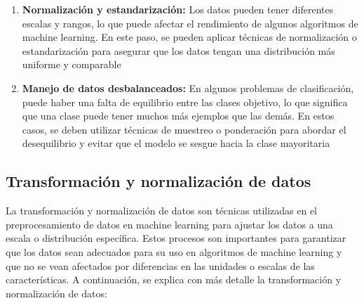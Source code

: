 \documentclass[../main.tex]{subfiles}
\begin{document}
\begin{enumerate}
            \item \textbf{Normalización y estandarización:} Los datos pueden tener diferentes escalas y rangos, lo que puede afectar el rendimiento de algunos algoritmos de machine learning. En este paso, se pueden aplicar técnicas de normalización o estandarización para asegurar que los datos tengan una distribución más uniforme y comparable
            \item \textbf{Manejo de datos desbalanceados:} En algunos problemas de clasificación, puede haber una falta de equilibrio entre las clases objetivo, lo que significa que una clase puede tener muchos más ejemplos que las demás. En estos casos, se deben utilizar técnicas de muestreo o ponderación para abordar el desequilibrio y evitar que el modelo se sesgue hacia la clase mayoritaria
        \end{enumerate}

    \subsection{Transformación y normalización de datos}
        La transformación y normalización de datos son técnicas utilizadas en el preprocesamiento de datos en machine learning para ajustar los datos a una escala o distribución específica. Estos procesos son importantes para garantizar que los datos sean adecuados para su uso en algoritmos de machine learning y que no se vean afectados por diferencias en las unidades o escalas de las características. A continuación, se explica con más detalle la transformación y normalización de datos:
	
\end{document}
